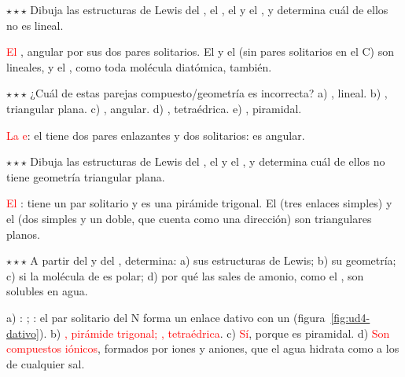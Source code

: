 \begin{exercise}
    \(\star\star\star\) Dibuja las estructuras de Lewis del , el , el  y el , y determina cuál de
    ellos no es lineal.
    \begin{solu}
        \textcolor{red}{El }, angular por sus dos pares solitarios. El  y el  (sin pares solitarios en el
        C) son lineales, y el , como toda molécula diatómica, también.
    \end{solu}
\end{exercise}

\begin{exercise}
    \(\star\star\star\) ¿Cuál de estas parejas compuesto/geometría es incorrecta? a) , lineal. b) , triangular
    plana. c) , angular. d) , tetraédrica. e) , piramidal.
    \begin{solu}
        \textcolor{red}{La e}: el  tiene dos pares enlazantes y dos solitarios: es angular.
    \end{solu}
\end{exercise}

\begin{exercise}
    \(\star\star\star\) Dibuja las estructuras de Lewis del , el  y el , y determina cuál de ellos no
    tiene geometría triangular plana.
    \begin{solu}
        \textcolor{red}{El }: tiene un par solitario y es una pirámide trigonal. El  (tres enlaces simples) y el
         (dos simples y un doble, que cuenta como una dirección) son triangulares planos.
    \end{solu}
\end{exercise}

\begin{exercise}
    \(\star\star\star\) A partir del  y del , determina: a) sus estructuras de Lewis; b) su geometría; c) si la
    molécula de  es polar; d) por qué las sales de amonio, como el , son solubles en agua.
    \begin{solu}
        a) : ; : el par solitario del N forma un enlace dativo con un
         (figura~\ref{fig:ud4-dativo}). b) \textcolor{red}{, pirámide trigonal; , tetraédrica}. c)
        \textcolor{red}{Sí}, porque es piramidal. d) \textcolor{red}{Son compuestos iónicos}, formados por iones  y
        aniones, que el agua hidrata como a los de cualquier sal.
    \end{solu}
\end{exercise}


